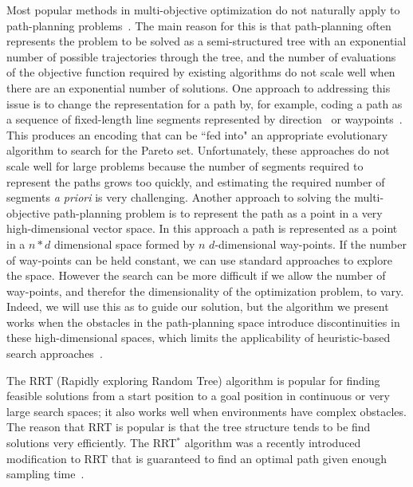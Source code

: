 \documentclass{article}
\begin{document}
Most popular methods in multi-objective optimization do not naturally apply to path-planning problems~\cite{4358754,6600851}.
The main reason for this is that path-planning often represents the problem to be solved as a semi-structured tree with an exponential number of possible trajectories through the tree, and the number of evaluations of the objective function required by existing algorithms do not scale well when there are an exponential number of solutions. 
One approach to addressing this issue is to change the representation for a path by, for example, coding a path as a sequence of fixed-length line segments represented by direction~\cite{Ahmed2013,howlett2006learning} or waypoints~\cite{5160222,Pires2004}.  
This produces an encoding that can be ``fed into" an appropriate evolutionary algorithm to search for the Pareto set. 
Unfortunately, these approaches do not scale well for large problems because the number of segments required to represent the paths grows too quickly, and estimating the required number of segments {\em a priori} is very challenging.  
Another approach to solving the multi-objective path-planning problem is to represent the path as a point in a very high-dimensional vector space. In this approach a path is represented as a point in a $ n * d $ dimensional space formed by $ n $ $ d $-dimensional way-points. If the number of way-points can be held constant, we can use standard approaches to explore the space. However the search can be more difficult if we allow the number of way-points, and therefor the dimensionality of the optimization problem, to vary.
Indeed, we will use this as to guide our solution, but the algorithm we present works when the obstacles in the path-planning space introduce discontinuities in these high-dimensional spaces, which limits the applicability of heuristic-based search approaches~\cite{5160222,4358754}.

The RRT (Rapidly exploring Random Tree) algorithm is popular for finding feasible solutions from a start position to a goal position in continuous or very large search spaces; it also works well when environments have complex obstacles. 
The reason that RRT is popular is that the tree structure tends to be find solutions very efficiently.
The RRT$^{*}$ algorithm was a recently introduced modification to RRT that is guaranteed to find an optimal path given enough sampling time~\cite{Karaman:2011:SAO:2000201.2000209,Karaman.Frazzoli:RSS10}.
\end{document}
